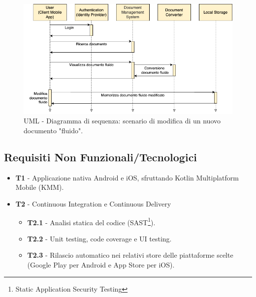 \begin{figure}[H]
\centering
\includegraphics[width=1\textwidth]{img/tesi-2-Use-case2.drawio.png}
\caption{UML - Diagramma di sequenza: scenario di modifica di un nuovo documento "fluido".}
\end{figure}

\subsection{Requisiti Non Funzionali/Tecnologici}
\begin{itemize}
    \item \textbf{T1} - Applicazione nativa Android e iOS, sfruttando Kotlin Multiplatform Mobile (KMM).
    \item \textbf{T2} - Continuous Integration e Continuous Delivery
    \begin{itemize}
        \item \textbf{T2.1} - Analisi statica del codice (SAST\footnote{Static Application Security Testing}).
        \item \textbf{T2.2} - Unit testing, code coverage e UI testing.
        \item \textbf{T2.3} - Rilascio automatico nei relativi store delle piattaforme scelte (Google Play per Android e App Store per iOS).
    \end{itemize}
\end{itemize}

